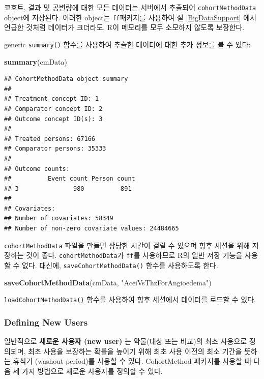 \documentclass[11pt]{book}
\newenvironment{Shaded}{\begin{snugshade}}{\end{snugshade}}
\newcommand{\KeywordTok}[1]{\textcolor[rgb]{0.13,0.29,0.53}{\textbf{#1}}}
\newcommand{\StringTok}[1]{\textcolor[rgb]{0.31,0.60,0.02}{#1}}
\newcommand{\NormalTok}[1]{#1}
\theoremstyle{definition}
\theoremstyle{definition}
\theoremstyle{definition}
\theoremstyle{remark}
\begin{document}
코호트, 결과 및 공변량에 대한 모든 데이터는 서버에서 추출되어
\texttt{cohortMethodData} object에 저장된다. 이러한 object는
\texttt{ff}패키지를 사용하여 절 \ref{BigDataSupport} 에서 언급한 것처럼
데이터가 크더라도, R이 메모리를 모두 소모하지 않도록 보장한다.

generic \texttt{summary()} 함수를 사용하여 추출한 데이터에 대한 추가
정보를 볼 수 있다:

\begin{Shaded}
\begin{Highlighting}[]
\KeywordTok{summary}\NormalTok{(cmData)}
\end{Highlighting}
\end{Shaded}

\begin{verbatim}
## CohortMethodData object summary
## 
## Treatment concept ID: 1
## Comparator concept ID: 2
## Outcome concept ID(s): 3
## 
## Treated persons: 67166
## Comparator persons: 35333
## 
## Outcome counts:
##          Event count Person count
## 3               980          891
## 
## Covariates:
## Number of covariates: 58349
## Number of non-zero covariate values: 24484665
\end{verbatim}

\texttt{cohortMethodData} 파일을 만들면 상당한 시간이 걸릴 수 있으며
향후 세션을 위해 저장하는 것이 좋다. \texttt{cohortMethodData}가
\texttt{ff}를 사용하므로 R의 일반 저장 기능을 사용할 수 없다. 대신에,
\texttt{saveCohortMethodData()} 함수를 사용하도록 한다.

\begin{Shaded}
\begin{Highlighting}[]
\KeywordTok{saveCohortMethodData}\NormalTok{(cmData, }\StringTok{"AceiVsThzForAngioedema"}\NormalTok{)}
\end{Highlighting}
\end{Shaded}

\texttt{loadCohortMethodData()} 함수를 사용하여 향후 세션에서 데이터를
로드할 수 있다.

\subsubsection*{Defining New Users}\label{defining-new-users}

일반적으로 \textbf{새로운 사용자 (new user)} 는 약물(대상 또는 비교)의
최초 사용으로 정의되며, 최초 사용을 보장하는 확률을 높이기 위해 최초
사용 이전의 최소 기간을 뜻하는 휴식기 (washout period)를 사용할 수 있다.
CohortMethod 패키지를 사용할 때 다음 세 가지 방법으로 새로운 사용자를
정의할 수 있다.
\end{document}

